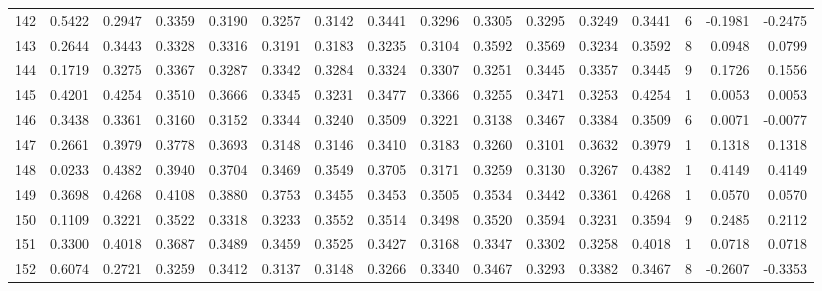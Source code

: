 \begin{tabular}{lrrrrrrrrrrrrrrr}
142 &      0.5422 &  0.2947 &  0.3359 &  0.3190 &  0.3257 &  0.3142 &  0.3441 &  0.3296 &  0.3305 &  0.3295 &   0.3249 &     0.3441 &      6 &                   -0.1981 &                    -0.2475 \\
143 &      0.2644 &  0.3443 &  0.3328 &  0.3316 &  0.3191 &  0.3183 &  0.3235 &  0.3104 &  0.3592 &  0.3569 &   0.3234 &     0.3592 &      8 &                    0.0948 &                     0.0799 \\
144 &      0.1719 &  0.3275 &  0.3367 &  0.3287 &  0.3342 &  0.3284 &  0.3324 &  0.3307 &  0.3251 &  0.3445 &   0.3357 &     0.3445 &      9 &                    0.1726 &                     0.1556 \\
145 &      0.4201 &  0.4254 &  0.3510 &  0.3666 &  0.3345 &  0.3231 &  0.3477 &  0.3366 &  0.3255 &  0.3471 &   0.3253 &     0.4254 &      1 &                    0.0053 &                     0.0053 \\
146 &      0.3438 &  0.3361 &  0.3160 &  0.3152 &  0.3344 &  0.3240 &  0.3509 &  0.3221 &  0.3138 &  0.3467 &   0.3384 &     0.3509 &      6 &                    0.0071 &                    -0.0077 \\
147 &      0.2661 &  0.3979 &  0.3778 &  0.3693 &  0.3148 &  0.3146 &  0.3410 &  0.3183 &  0.3260 &  0.3101 &   0.3632 &     0.3979 &      1 &                    0.1318 &                     0.1318 \\
148 &      0.0233 &  0.4382 &  0.3940 &  0.3704 &  0.3469 &  0.3549 &  0.3705 &  0.3171 &  0.3259 &  0.3130 &   0.3267 &     0.4382 &      1 &                    0.4149 &                     0.4149 \\
149 &      0.3698 &  0.4268 &  0.4108 &  0.3880 &  0.3753 &  0.3455 &  0.3453 &  0.3505 &  0.3534 &  0.3442 &   0.3361 &     0.4268 &      1 &                    0.0570 &                     0.0570 \\
150 &      0.1109 &  0.3221 &  0.3522 &  0.3318 &  0.3233 &  0.3552 &  0.3514 &  0.3498 &  0.3520 &  0.3594 &   0.3231 &     0.3594 &      9 &                    0.2485 &                     0.2112 \\
151 &      0.3300 &  0.4018 &  0.3687 &  0.3489 &  0.3459 &  0.3525 &  0.3427 &  0.3168 &  0.3347 &  0.3302 &   0.3258 &     0.4018 &      1 &                    0.0718 &                     0.0718 \\
152 &      0.6074 &  0.2721 &  0.3259 &  0.3412 &  0.3137 &  0.3148 &  0.3266 &  0.3340 &  0.3467 &  0.3293 &   0.3382 &     0.3467 &      8 &                   -0.2607 &                    -0.3353 \\

\end{tabular}
